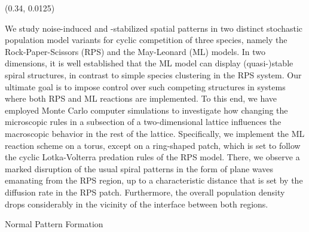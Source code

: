 \documentclass{beamer}
\begin{document}
\begin{frame}{}
\begin{textblock}{0.32}(0.34, 0.0125)
    \begin{block}{}
        \maketitle
        \centering
        We study noise-induced and -stabilized spatial patterns in two distinct stochastic 
        population model variants for cyclic competition of three species, namely the 
        Rock-Paper-Scissors (RPS) and the May-Leonard (ML) models. In two dimensions, 
        it is well established that the ML model can display (quasi-)stable spiral 
        structures, in contrast to simple species clustering in the RPS system. Our 
        ultimate goal is to impose control over such competing structures in systems 
        where both RPS and ML reactions are implemented. To this end, we have employed 
        Monte Carlo computer simulations to investigate how changing the microscopic 
        rules in a subsection of a two-dimensional lattice influences the macroscopic 
        behavior in the rest of the lattice. Specifically, we implement the ML reaction scheme 
        on a torus, except on a ring-shaped patch, which is set to follow the cyclic 
        Lotka-Volterra predation rules of the RPS model. There, we observe a marked disruption of 
        the usual spiral patterns in the form of plane waves emanating from the RPS region, 
        up to a characteristic distance that is set by the diffusion rate in the RPS 
        patch. Furthermore, the overall population density drops considerably in the 
        vicinity of the interface between both regions. 
    \end{block}
    \hfill
    \begin{block}{Normal Pattern Formation}
        \begin{figure}[h]
            \centering

\end{figure}
\end{block}
\end{textblock}
\end{frame}
\end{document}

